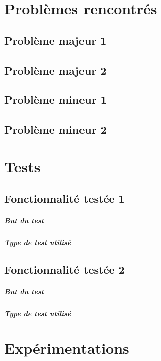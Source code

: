 \documentclass[
	headsepline=on,
	footsepline=on,
	twoside=off,
	abstract=on,
	DIV=10
]{scrreprt}
\begin{document}
		\chapter{Problèmes rencontrés}
		
			\section{Problème majeur 1}
			\section{Problème majeur 2}
			
			\section{Problème mineur 1}
			\section{Problème mineur 2}

		\chapter{Tests}
			\section{Fonctionnalité testée 1}
				\paragraph{But du test}
				\paragraph{Type de test utilisé}

			\section{Fonctionnalité testée 2}
				\paragraph{But du test}
				\paragraph{Type de test utilisé}
				
		\chapter{Expérimentations}
\end{document}
